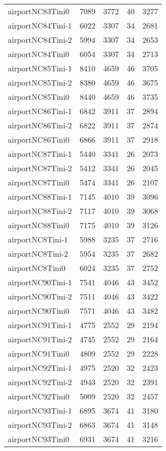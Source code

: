 \begin{longtable}{lrrrr}
airportNC83Tini0 & 7089 & 3772 & 40 & 3277 \\
airportNC84Tini-1 & 6022 & 3307 & 34 & 2681 \\
airportNC84Tini-2 & 5994 & 3307 & 34 & 2653 \\
airportNC84Tini0 & 6054 & 3307 & 34 & 2713 \\
airportNC85Tini-1 & 8410 & 4659 & 46 & 3705 \\
airportNC85Tini-2 & 8380 & 4659 & 46 & 3675 \\
airportNC85Tini0 & 8440 & 4659 & 46 & 3735 \\
airportNC86Tini-1 & 6842 & 3911 & 37 & 2894 \\
airportNC86Tini-2 & 6822 & 3911 & 37 & 2874 \\
airportNC86Tini0 & 6866 & 3911 & 37 & 2918 \\
airportNC87Tini-1 & 5440 & 3341 & 26 & 2073 \\
airportNC87Tini-2 & 5412 & 3341 & 26 & 2045 \\
airportNC87Tini0 & 5474 & 3341 & 26 & 2107 \\
airportNC88Tini-1 & 7145 & 4010 & 39 & 3096 \\
airportNC88Tini-2 & 7117 & 4010 & 39 & 3068 \\
airportNC88Tini0 & 7175 & 4010 & 39 & 3126 \\
airportNC8Tini-1 & 5988 & 3235 & 37 & 2716 \\
airportNC8Tini-2 & 5954 & 3235 & 37 & 2682 \\
airportNC8Tini0 & 6024 & 3235 & 37 & 2752 \\
airportNC90Tini-1 & 7541 & 4046 & 43 & 3452 \\
airportNC90Tini-2 & 7511 & 4046 & 43 & 3422 \\
airportNC90Tini0 & 7571 & 4046 & 43 & 3482 \\
airportNC91Tini-1 & 4775 & 2552 & 29 & 2194 \\
airportNC91Tini-2 & 4745 & 2552 & 29 & 2164 \\
airportNC91Tini0 & 4809 & 2552 & 29 & 2228 \\
airportNC92Tini-1 & 4975 & 2520 & 32 & 2423 \\
airportNC92Tini-2 & 4943 & 2520 & 32 & 2391 \\
airportNC92Tini0 & 5009 & 2520 & 32 & 2457 \\
airportNC93Tini-1 & 6895 & 3674 & 41 & 3180 \\
airportNC93Tini-2 & 6863 & 3674 & 41 & 3148 \\
airportNC93Tini0 & 6931 & 3674 & 41 & 3216 \\

\end{longtable}
